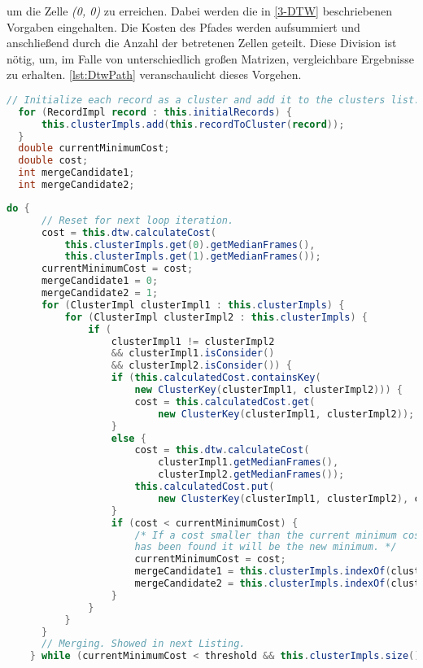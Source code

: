 um die Zelle \emph{(0, 0)} zu erreichen.
Dabei werden die in \autoref{3-DTW} beschriebenen Vorgaben eingehalten.
Die Kosten des Pfades werden aufsummiert und anschließend durch die Anzahl der betretenen Zellen geteilt.
Diese Division ist nötig, um, im Falle von unterschiedlich großen Matrizen, vergleichbare Ergebnisse zu erhalten.
\autoref{lst:DtwPath} veranschaulicht dieses Vorgehen.
\begin{lstfloat}
\begin{lstlisting}[language=Java, label={lst:ClustInit}, caption=Cluster-Methode: Initialisierung.]
  // Initialize each record as a cluster and add it to the clusters list.
  for (RecordImpl record : this.initialRecords) {
      this.clusterImpls.add(this.recordToCluster(record));
  }
  double currentMinimumCost;
  double cost;
  int mergeCandidate1;
  int mergeCandidate2;
\end{lstlisting}
\end{lstfloat}
\begin{lstfloat}
    \begin{lstlisting}[language=Java, label={lst:ClustCalc}, caption=Cluster-Methode: Berechnungsvorgang.]
    do {
      // Reset for next loop iteration.
      cost = this.dtw.calculateCost(    
          this.clusterImpls.get(0).getMedianFrames(),
          this.clusterImpls.get(1).getMedianFrames());
      currentMinimumCost = cost;
      mergeCandidate1 = 0;
      mergeCandidate2 = 1;
      for (ClusterImpl clusterImpl1 : this.clusterImpls) {
          for (ClusterImpl clusterImpl2 : this.clusterImpls) {
              if (
                  clusterImpl1 != clusterImpl2
                  && clusterImpl1.isConsider()
                  && clusterImpl2.isConsider()) {
                  if (this.calculatedCost.containsKey(
                      new ClusterKey(clusterImpl1, clusterImpl2))) {
                      cost = this.calculatedCost.get(
                          new ClusterKey(clusterImpl1, clusterImpl2));
                  }
                  else {
                      cost = this.dtw.calculateCost(
                          clusterImpl1.getMedianFrames(),
                          clusterImpl2.getMedianFrames());
                      this.calculatedCost.put(
                          new ClusterKey(clusterImpl1, clusterImpl2), cost);
                  }
                  if (cost < currentMinimumCost) {
                      /* If a cost smaller than the current minimum cost
                      has been found it will be the new minimum. */
                      currentMinimumCost = cost;
                      mergeCandidate1 = this.clusterImpls.indexOf(clusterImpl1);
                      mergeCandidate2 = this.clusterImpls.indexOf(clusterImpl2);
                  }
              }
          }
      }
      // Merging. Showed in next Listing.
    } while (currentMinimumCost < threshold && this.clusterImpls.size() > 1);
\end{lstlisting}
\end{lstfloat}
